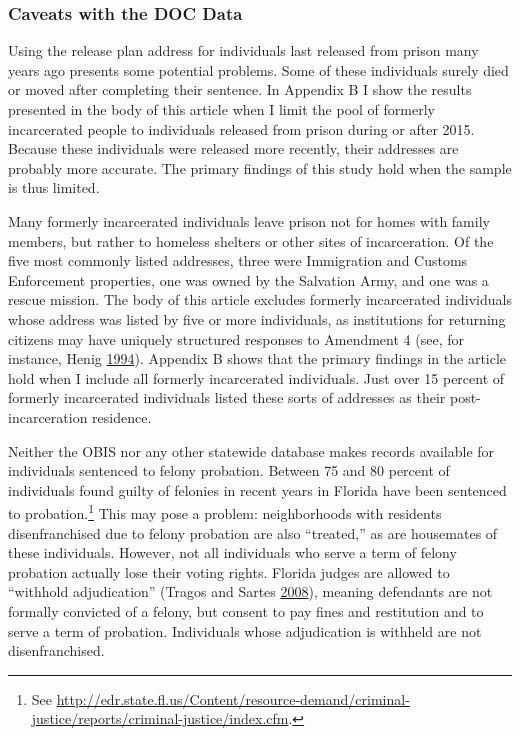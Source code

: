 \documentclass[
  12pt,
]{article}
\begin{document}
\hypertarget{caveats-with-the-doc-data}{%
\subsubsection*{Caveats with the DOC Data}\label{caveats-with-the-doc-data}}

Using the release plan address for individuals last released from prison many years ago presents some potential problems. Some of these individuals surely died or moved after completing their sentence. In Appendix B I show the results presented in the body of this article when I limit the pool of formerly incarcerated people to individuals released from prison during or after 2015. Because these individuals were released more recently, their addresses are probably more accurate. The primary findings of this study hold when the sample is thus limited.

Many formerly incarcerated individuals leave prison not for homes with family members, but rather to homeless shelters or other sites of incarceration. Of the five most commonly listed addresses, three were Immigration and Customs Enforcement properties, one was owned by the Salvation Army, and one was a rescue mission. The body of this article excludes formerly incarcerated individuals whose address was listed by five or more individuals, as institutions for returning citizens may have uniquely structured responses to Amendment 4 (see, for instance, Henig \protect\hyperlink{ref-Henig1994}{1994}). Appendix B shows that the primary findings in the article hold when I include all formerly incarcerated individuals. Just over 15 percent of formerly incarcerated individuals listed these sorts of addresses as their post-incarceration residence.

Neither the OBIS nor any other statewide database makes records available for individuals sentenced to felony probation. Between 75 and 80 percent of individuals found guilty of felonies in recent years in Florida have been sentenced to probation.\footnote{See \url{http://edr.state.fl.us/Content/resource-demand/criminal-justice/reports/criminal-justice/index.cfm}.} This may pose a problem: neighborhoods with residents disenfranchised due to felony probation are also ``treated,'' as are housemates of these individuals. However, not all individuals who serve a term of felony probation actually lose their voting rights. Florida judges are allowed to ``withhold adjudication'' (Tragos and Sartes \protect\hyperlink{ref-Tragos2008}{2008}), meaning defendants are not formally convicted of a felony, but consent to pay fines and restitution and to serve a term of probation. Individuals whose adjudication is withheld are not disenfranchised.
\end{document}
